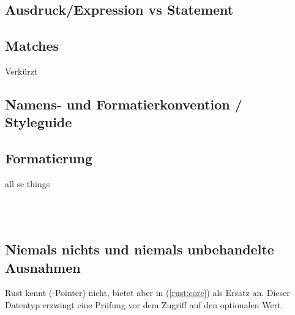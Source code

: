 \subsection{Ausdruck/Expression vs Statement}



\subsection{Matches}
\label{rust:match}


Verkürzt




\subsection{Namens- und Formatierkonvention / Styleguide}

\cite{rust:styleguide}

\subsection{Formatierung}
 all se things






 \\

 \\
\cite{rust:orly_programming}


\subsection{Niemals nichts und niemals unbehandelte Ausnahmen}
\label{rust:no_null}

Rust kennt (-Pointer) nicht, bietet aber in  (\autoref{rust:core})  als Ersatz an.
Dieser Datentyp erzwingt eine Prüfung vor dem Zugriff auf den optionalen Wert.

